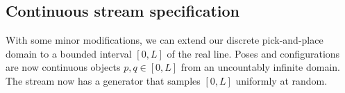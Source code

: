 \documentclass[letterpaper]{article} %
\newcommand\lpknote[1]{\todo[inline, color=green!10, linecolor=green!90,
  size=\footnotesize]{\linespread{0.9}\selectfont{{\bf LPK:} #1}\par}}
\theoremstyle{plain}\newtheorem{thm}{Theorem}
\theoremstyle{definition}\newtheorem{defn}{Definition}
\theoremstyle{plain}\newtheorem{lem}{Lemma}
\theoremstyle{plain}\newtheorem{cor}{Corollary}
\begin{document}
\subsection{Continuous stream specification}

With some minor modifications, we can extend our discrete
pick-and-place domain to a bounded interval $[0, L]$ of the real
line.  Poses and configurations are now continuous objects
$p, q \in [0, L]$ from an uncountably infinite domain.  
The stream  now has a generator that samples $[0, L]$
uniformly at random.  
\end{document}
